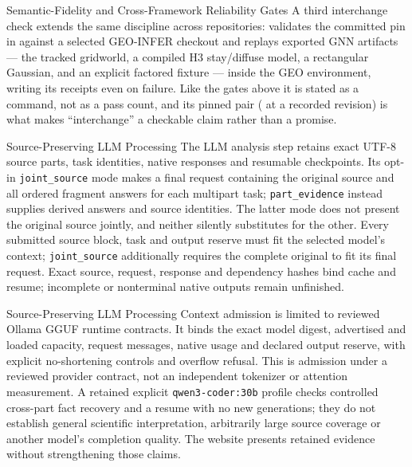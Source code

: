 \documentclass[
  ignorenonframetext,
]{beamer}
\begin{document}
\begin{frame}{Semantic-Fidelity and
Cross-Framework Reliability Gates}
A third interchange check extends the same discipline across
repositories: 
validates the committed pin in  against a
selected GEO-INFER checkout and replays exported GNN artifacts --- the
tracked gridworld, a compiled H3 stay/diffuse model, a rectangular
Gaussian, and an explicit factored fixture --- inside the GEO
environment, writing its receipts even on failure. Like the gates above
it is stated as a command, not as a pass count, and its pinned pair
( at a recorded revision) is
what makes ``interchange'' a checkable claim rather than a promise.
\end{frame}

\begin{frame}{Source-Preserving LLM
Processing}
\protect{}\label{source-preserving-llm-processing}
The LLM analysis step retains exact UTF-8 source parts, task identities,
native responses and resumable checkpoints. Its opt-in
\texttt{joint\_source} mode makes a final request containing the
original source and all ordered fragment answers for each multipart
task; \texttt{part\_evidence} instead supplies derived answers and
source identities. The latter mode does not present the original source
jointly, and neither silently substitutes for the other. Every submitted
source block, task and output reserve must fit the selected model's
context; \texttt{joint\_source} additionally requires the complete
original to fit its final request. Exact source, request, response and
dependency hashes bind cache and resume; incomplete or nonterminal
native outputs remain unfinished.

\end{frame}

\begin{frame}{Source-Preserving LLM
Processing}
Context admission is limited to reviewed Ollama GGUF runtime contracts.
It binds the exact model digest, advertised and loaded capacity, request
messages, native usage and declared output reserve, with explicit
no-shortening controls and overflow refusal. This is admission under a
reviewed provider contract, not an independent tokenizer or attention
measurement. A retained explicit \texttt{qwen3-coder:30b} profile checks
controlled cross-part fact recovery and a resume with no new
generations; they do not establish general scientific interpretation,
arbitrarily large source coverage or another model's completion quality.
The website presents retained evidence without strengthening those
claims.
\end{frame}
\end{document}
